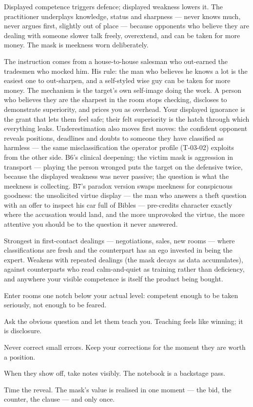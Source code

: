 \begin{core}
Displayed competence triggers defence; displayed weakness lowers it. The practitioner underplays knowledge, status and sharpness --- never knows much, never argues first, slightly out of place --- because opponents who believe they are dealing with someone slower talk freely, overextend, and can be taken for more money. The mask is meekness worn deliberately.
\end{core}
\begin{mechanism}
The instruction comes from a house-to-house salesman who out-earned the tradesmen who mocked him. His rule: the man who believes he knows a lot is the easiest one to out-sharpen, and a self-styled wise guy can be taken for more money. The mechanism is the target's own self-image doing the work. A person who believes they are the sharpest in the room stops checking, discloses to demonstrate superiority, and prices you as overhead. Your displayed ignorance is the grant that lets them feel safe; their felt superiority is the hatch through which everything leaks. Underestimation also moves first moves: the confident opponent reveals positions, deadlines and doubts to someone they have classified as harmless --- the same misclassification the operator profile (T-03-02) exploits from the other side. B6's clinical deepening: the victim mask is aggression in transport --- playing the person wronged puts the target on the defensive twice, because the displayed weakness was never passive; the question is what the meekness is collecting. B7's paradox version swaps meekness for conspicuous goodness: the unsolicited virtue display --- the man who answers a theft question with an offer to inspect his car full of Bibles --- pre-credits character exactly where the accusation would land, and the more unprovoked the virtue, the more attentive you should be to the question it never answered.
\end{mechanism}
\begin{conditions}
Strongest in first-contact dealings --- negotiations, sales, new rooms --- where classifications are fresh and the counterpart has an ego invested in being the expert. Weakens with repeated dealings (the mask decays as data accumulates), against counterparts who read calm-and-quiet as training rather than deficiency, and anywhere your visible competence is itself the product being bought.
\end{conditions}
\begin{application}
  \item Enter rooms one notch below your actual level: competent enough to be taken seriously, not enough to be feared.
  \item Ask the obvious question and let them teach you. Teaching feels like winning; it is disclosure.
  \item Never correct small errors. Keep your corrections for the moment they are worth a position.
  \item When they show off, take notes visibly. The notebook is a backstage pass.
  \item Time the reveal. The mask's value is realised in one moment --- the bid, the counter, the clause --- and only once.
\end{application}
